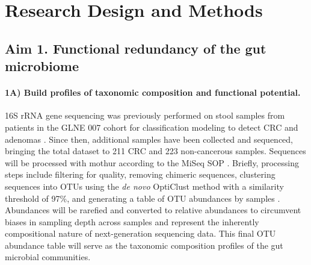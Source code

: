 \documentclass[11pt]{article}
\begin{document}
\section*{Research Design and Methods}

\subsection*{Aim 1. Functional redundancy of the gut microbiome}

\paragraph{1A) Build profiles of taxonomic composition and functional potential.}

16S rRNA gene sequencing was previously performed on stool samples from patients in the GLNE 007 cohort for classification modeling to detect CRC and adenomas \cite{baxter_microbiota-based_2016}.
Since then, additional samples have been collected and sequenced, bringing the total dataset to 211 CRC and 223 non-cancerous samples.
Sequences will be processed with mothur according to the MiSeq SOP \cite{schloss_introducing_2009, kozich_development_2013}.
Briefly, processing steps include filtering for quality, removing chimeric sequences, clustering sequences into OTUs using the \textit{de novo} OptiClust method with a similarity threshold of 97\%,
and generating a table of OTU abundances by samples \cite{westcott_opticlust_2017}.
Abundances will be rarefied and converted to relative abundances to circumvent biases in sampling depth across samples and represent the inherently compositional nature of next-generation sequencing data.
This final OTU abundance table will serve as the taxonomic composition profiles of the gut microbial communities.
\end{document}
